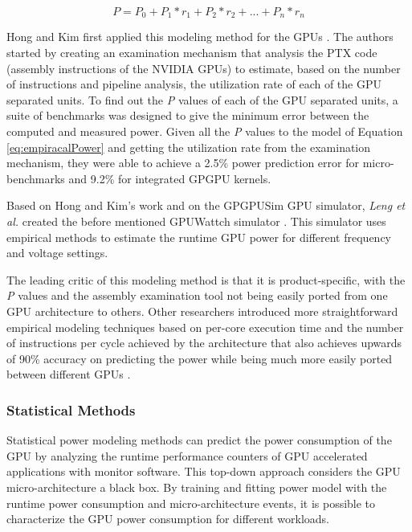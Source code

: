 \begin{equation}
\label{eq:empiracalPower}
    P = P_0 + P_1 * r_1 +  P_2 * r_2 + ... + P_n * r_n
\end{equation}

Hong and Kim first applied this modeling method for the GPUs \cite{hong_integrated_nodate}. The authors started by creating an examination mechanism that analysis the PTX code (assembly instructions of the NVIDIA GPUs) to estimate, based on the number of instructions and pipeline analysis, the utilization rate of each of the GPU separated units. To find out the \textit{P} values of each of the GPU separated units, a suite of benchmarks was designed to give the minimum error between the computed and measured power. Given all the \textit{P} values to the model of Equation \ref{eq:empiracalPower} and getting the utilization rate from the examination mechanism, they were able to achieve a 2.5\% power prediction error for micro-benchmarks and 9.2\% for integrated GPGPU kernels.

Based on Hong and Kim's work and on the GPGPUSim GPU simulator, \textit{Leng et al.} created the before mentioned GPUWattch simulator \cite{noauthor_gpu_nodate} \cite{leng_gpuwattch:_2013}. This simulator uses empirical methods to estimate the runtime GPU power for different frequency and voltage settings. 

The leading critic of this modeling method is that it is product-specific, with the \textit{P} values and the assembly examination tool not being easily ported from one GPU architecture to others. Other researchers introduced more straightforward empirical modeling techniques based on per-core execution time and the number of instructions per cycle achieved by the architecture that also achieves upwards of 90\% accuracy on predicting the power while being much more easily ported between different GPUs \cite{mei_survey_2016}.

\subsubsection{Statistical Methods}
\label{subsubsection:StatisticalMethods}

Statistical power modeling methods can predict the power consumption of the GPU by analyzing the runtime performance counters of GPU accelerated applications with monitor software. This top-down approach considers the GPU micro-architecture a black box. By training and fitting power model with the runtime power consumption and micro-architecture events, it is possible to characterize the GPU power consumption for different workloads.


